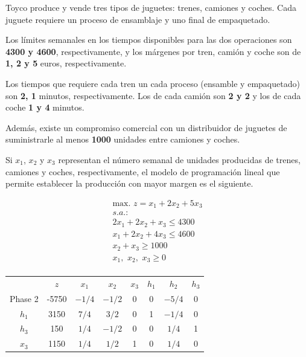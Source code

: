 Toyco produce y vende tres tipos de juguetes: trenes, camiones y coches. 
Cada juguete requiere un proceso de ensamblaje y uno final de empaquetado. 

Los límites semanales  en los tiempos disponibles para las dos operaciones son \textbf{4300 y 4600}, respectivamente, y los márgenes por tren, camión y coche son de \textbf{1, 2 y 5 }euros, respectivamente. 

Los tiempos que requiere cada tren un cada proceso (ensamble y empaquetado) son \textbf{2, 1} minutos, respectivamente. Los de cada camión son \textbf{2 y 2} y los de cada coche \textbf{1 y 4} minutos.

Además, existe un compromiso comercial con un distribuidor de juguetes de suministrarle al menos \textbf{1000} unidades entre camiones y coches.

Si $x_1$, $x_2$ y $x_3$ representan el número semanal de unidades producidas de trenes, camiones y coches, respectivamente, el modelo de programación lineal que permite establecer la producción con mayor margen es el siguiente.

\begin{equation}
\begin{split}
\mbox{max. } z =  x_1 + 2x_2 + 5x_3\\
s.a.:\\
2x_1 + 2x_2 +  x_3 \leq 4300\\
 x_1 + 2x_2 + 4x_3 \leq 4600\\
        x_2 +  x_3 \geq 1000\\
x_1,\,\,x_2,\,\,x_3\geq 0\\
\end{split}
\end{equation}

\begin{center}
\begin{tabular}{c|c|cccccc|}
 & $z$ & $x_1$ & $x_2$ & $x_3$ & $h_1$ & $h_2$ & $h_3$\\ 
Phase 2 & -5750 & $-1/4$ & $-1/2$ & 0 & 0 & $-5/4$ & 0 \\ 
\hline
$h_1$ & 3150  & $7/4$ & $3/2$ & 0 & 1 & $-1/4$ & 0\\ 
$h_3$ & 150  & $1/4$ & $-1/2$ & 0 & 0 & $1/4$ & 1\\ 
$x_3$ & 1150  & $1/4$ & $1/2$ & 1 & 0 & $1/4$ & 0\\ 
\hline
\end{tabular}
\end{center}





